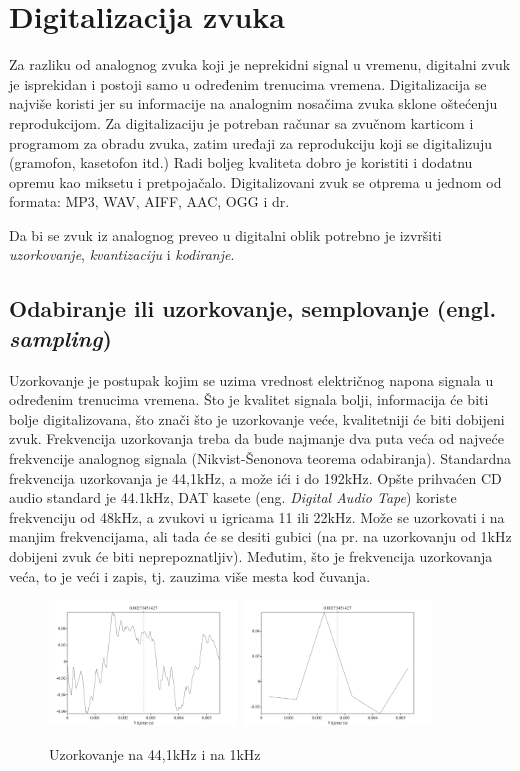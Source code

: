 \documentclass[11pt]{article}
\begin{document}
\section{Digitalizacija zvuka}
Za razliku od analognog zvuka koji je neprekidni signal u vremenu, digitalni zvuk je isprekidan i postoji samo u određenim trenucima vremena. Digitalizacija se najviše koristi jer su informacije na analognim nosačima zvuka sklone oštećenju reprodukcijom. Za digitalizaciju je potreban računar sa zvučnom karticom i programom za obradu zvuka, zatim uređaji za reprodukciju koji se digitalizuju (gramofon, kasetofon itd.) Radi boljeg kvaliteta dobro je koristiti i dodatnu opremu kao miksetu i pretpojačalo. Digitalizovani zvuk se otprema u jednom od formata: MP3, WAV, AIFF, AAC, OGG i dr.

Da bi se zvuk iz analognog preveo u digitalni oblik potrebno je izvršiti \textit{uzorkovanje}, \textit{kvantizaciju} i \textit{kodiranje}.

\subsection{Odabiranje ili uzorkovanje, semplovanje (engl. \textit{sampling})}
Uzorkovanje je postupak kojim se uzima vrednost električnog napona signala u određenim trenucima vremena. Što je kvalitet signala bolji, informacija će biti bolje digitalizovana, što znači što je uzorkovanje veće, kvalitetniji će biti dobijeni zvuk. Frekvencija uzorkovanja treba da bude najmanje dva puta veća od najveće frekvencije analognog signala (Nikvist-Šenonova teorema odabiranja). Standardna frekvencija uzorkovanja je 44,1kHz, a može ići i do 192kHz. Opšte prihvaćen CD audio standard je 44.1kHz, DAT kasete (eng. \textit{Digital Audio Tape}) koriste frekvenciju od 48kHz, a zvukovi u igricama 11 ili 22kHz. Može se uzorkovati i na manjim frekvencijama, ali tada će se desiti gubici (na pr. na uzorkovanju od 1kHz dobijeni zvuk će biti neprepoznatljiv). Međutim, što je frekvencija uzorkovanja veća, to je veći i zapis, tj. zauzima više mesta kod čuvanja.

\begin{figure}[!h]
    \centering
    \includegraphics[width=5cm]{Uzorkovanje1}
    \includegraphics[width=5cm]{Uzorkovanje2}
    \caption{Uzorkovanje na 44,1kHz i na 1kHz}
\end{figure}
\end{document}
